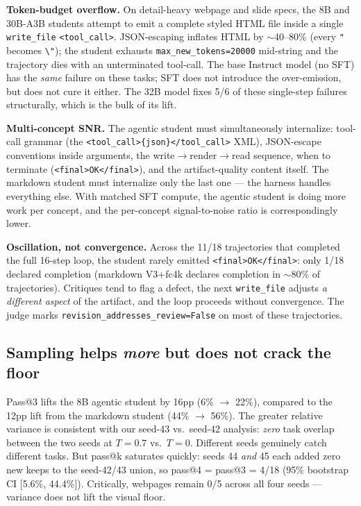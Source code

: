 \documentclass[11pt]{article}
\begin{document}
\textbf{Token-budget overflow.} On detail-heavy webpage and slide specs, the 8B and 30B-A3B students attempt to emit a complete styled HTML file inside a single \texttt{write\_file} \texttt{<tool\_call>}. JSON-escaping inflates HTML by $\sim$40--80\% (every \texttt{"} becomes \texttt{\textbackslash"}); the student exhausts \texttt{max\_new\_tokens=20000} mid-string and the trajectory dies with an unterminated tool-call. The base Instruct model (no SFT) has the \emph{same} failure on these tasks; SFT does not introduce the over-emission, but does not cure it either. The 32B model fixes 5/6 of these single-step failures structurally, which is the bulk of its lift.

\textbf{Multi-concept SNR.} The agentic student must simultaneously internalize: tool-call grammar (the \texttt{<tool\_call>\{json\}</tool\_call>} XML), JSON-escape conventions inside arguments, the write$\to$render$\to$read sequence, when to terminate (\texttt{<final>OK</final>}), and the artifact-quality content itself. The markdown student must internalize only the last one --- the harness handles everything else. With matched SFT compute, the agentic student is doing more work per concept, and the per-concept signal-to-noise ratio is correspondingly lower.

\textbf{Oscillation, not convergence.} Across the 11/18 trajectories that completed the full 16-step loop, the student rarely emitted \texttt{<final>OK</final>}: only 1/18 declared completion (markdown V3+fc4k declares completion in $\sim$80\% of trajectories). Critiques tend to flag a defect, the next \texttt{write\_file} adjusts \emph{a different aspect} of the artifact, and the loop proceeds without convergence. The judge marks \texttt{revision\_addresses\_review=False} on most of these trajectories.

\subsection{Sampling helps \emph{more} but does not crack the floor}

Pass@3 lifts the 8B agentic student by 16pp (6\% $\to$ 22\%), compared to the 12pp lift from the markdown student (44\% $\to$ 56\%). The greater relative variance is consistent with our seed-43 vs.\ seed-42 analysis: \emph{zero} task overlap between the two seeds at $T{=}0.7$ vs.\ $T{=}0$. Different seeds genuinely catch different tasks. But pass@k saturates quickly: seeds 44 \emph{and} 45 each added zero new keeps to the seed-42/43 union, so pass@4 = pass@3 = 4/18 (95\% bootstrap CI [5.6\%, 44.4\%]). Critically, webpages remain 0/5 across all four seeds --- variance does not lift the visual floor.
\end{document}
